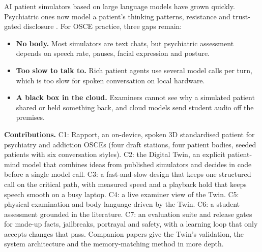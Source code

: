 \documentclass{article}
\begin{document}
AI patient simulators based on large language models have grown quickly. Psychiatric ones now model a patient's thinking patterns, resistance and
trust-gated disclosure \cite{wang2024patient,lee2025psyche,sabour2026patientact}. For OSCE practice, three gaps remain:
\begin{itemize}
\item \textbf{No body.} Most simulators are text chats, but psychiatric assessment depends on speech rate, pauses, facial expression and posture.
\item \textbf{Too slow to talk to.} Rich patient agents use several model calls per turn, which is too slow for spoken conversation on local hardware.
\item \textbf{A black box in the cloud.} Examiners cannot see why a simulated patient shared or held something back, and cloud models send student
audio off the premises.
\end{itemize}

\textbf{Contributions.}
C1: Rapport, an on-device, spoken 3D standardised patient for psychiatry and addiction OSCEs (four draft stations, four patient bodies, seeded patients
with six conversation styles).
C2: the Digital Twin, an explicit patient-mind model that combines ideas from published simulators and decides in code before a single model call.
C3: a fast-and-slow design that keeps one structured call on the critical path, with measured speed and a playback hold that keeps speech smooth
on a busy laptop.
C4: a live examiner view of the Twin.
C5: physical examination and body language driven by the Twin.
C6: a student assessment grounded in the literature.
C7: an evaluation suite and release gates for made-up facts, jailbreaks, portrayal and safety, with a learning loop that only accepts changes that pass.
Companion papers give the Twin's validation, the system architecture and the memory-matching method in more depth.
\end{document}
